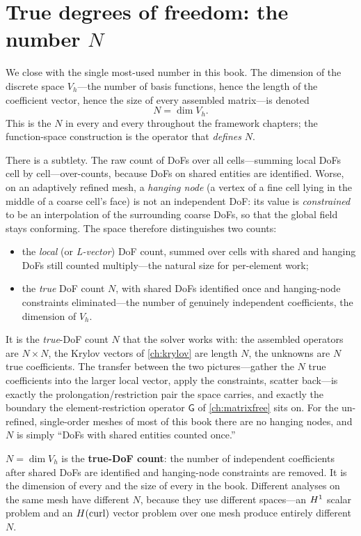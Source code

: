 \section{True degrees of freedom: the number $N$}
\label{sec:truedof}

We close with the single most-used number in this book. The dimension of the discrete space
$V_h$---the number of basis functions, hence the length of the coefficient vector, hence the size
of every assembled matrix---is denoted
\[
  N = \dim V_h.
\]
This is the $N$ in every  and every  throughout the
framework chapters; the function-space construction is the operator that \emph{defines} $N$.

There is a subtlety. The raw count of DoFs over all cells---summing local DoFs cell by cell---over-counts, because DoFs on shared entities are identified. Worse, on an adaptively refined mesh, a
\emph{hanging node} (a vertex of a fine cell lying in the middle of a coarse cell's face) is not an
independent DoF: its value is \emph{constrained} to be an interpolation of the surrounding coarse
DoFs, so that the global field stays conforming. The space therefore distinguishes two counts:

\begin{itemize}[nosep]
\item the \emph{local} (or \emph{L-vector}) DoF count, summed over cells with shared and hanging
  DoFs still counted multiply---the natural size for per-element work;
\item the \emph{true} DoF count $N$, with shared DoFs identified once and hanging-node constraints
  eliminated---the number of genuinely independent coefficients, the dimension of $V_h$.
\end{itemize}

It is the \emph{true}-DoF count $N$ that the solver works with: the assembled operators are $N\times
N$, the Krylov vectors of \cref{ch:krylov} are length $N$, the unknowns are $N$ true coefficients.
The transfer between the two pictures---gather the $N$ true coefficients into the larger local
vector, apply the constraints, scatter back---is exactly the prolongation/restriction pair the space
carries, and exactly the boundary the element-restriction operator $\mathsf{G}$ of
\cref{ch:matrixfree} sits on. For the un-refined, single-order meshes of most of this book there are
no hanging nodes, and $N$ is simply ``DoFs with shared entities counted once.''

\begin{notationbox}
$N = \dim V_h$ is the \textbf{true-DoF count}: the number of independent coefficients after shared
DoFs are identified and hanging-node constraints are removed. It is the dimension of every
 and the size of every  in the book. Different analyses on
the same mesh have different $N$, because they use different spaces---an $H^1$ scalar problem and
an $H(\mathrm{curl})$ vector problem over one mesh produce entirely different $N$.
\end{notationbox}

